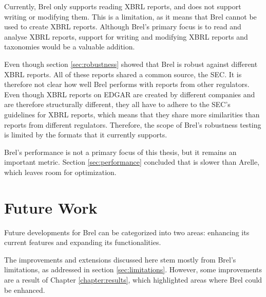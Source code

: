 Currently, Brel only supports reading XBRL reports, and does not support writing or modifying them.
This is a limitation, as it means that Brel cannot be used to create XBRL reports.
Although Brel's primary focus is to read and analyse XBRL reports,
support for writing and modifying XBRL reports and taxonomies would be a valuable addition.

Even though section \ref{sec:robustness} showed that Brel is robust against different XBRL reports.
All of these reports shared a common source, the SEC.
It is therefore not clear how well Brel performs with reports from other regulators.
Even though XBRL reports on EDGAR are created by different companies and are therefore structurally different,
they all have to adhere to the SEC's guidelines for XBRL reports, 
which means that they share more similarities than reports from different regulators.
Therefore, the scope of Brel's robustness testing is limited by the formats that it currently supports.

Brel's performance is not a primary focus of this thesis, but it remains an important metric.
Section \ref{sec:performance} concluded that is slower than Arelle, which leaves room for optimization.


\section{Future Work}

Future developments for Brel can be categorized into two areas: 
\textcolor{airforceblue}{enhancing its current features}
and 
\textcolor{turkishrose}{expanding its functionalities}. 

The improvements and extensions discussed here stem mostly from Brel's limitations, 
as addressed in section \ref{sec:limitations}.
However, some improvements are a result of Chapter \ref{chapter:results},
which highlighted areas where Brel could be enhanced.

